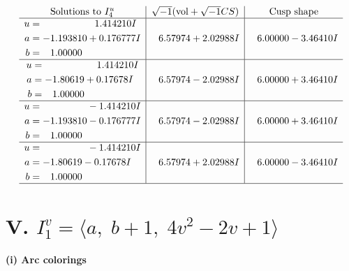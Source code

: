 \documentclass[1p]{elsarticle_modified}
\theoremstyle{definition}
\newcommand{\I}{\sqrt{-1}}
\begin{document}
$$\begin{array}{c|c|c}  
\text{Solutions to }I^u_{4}& \I (\text{vol} + \sqrt{-1}CS) & \text{Cusp shape}\\
 \hline 
\begin{aligned}
u &= \phantom{-0.000000 -}1.414210 I \\
a &= -1.193810 + 0.176777 I \\
b &= \phantom{-}1.00000\phantom{ +0.000000I}\end{aligned}
 & \phantom{-}6.57974 + 2.02988 I & \phantom{-}6.00000 - 3.46410 I \\ \hline\begin{aligned}
u &= \phantom{-0.000000 -}1.414210 I \\
a &= -1.80619 + 0.17678 I \\
b &= \phantom{-}1.00000\phantom{ +0.000000I}\end{aligned}
 & \phantom{-}6.57974 - 2.02988 I & \phantom{-}6.00000 + 3.46410 I \\ \hline\begin{aligned}
u &= \phantom{-0.000000 } -1.414210 I \\
a &= -1.193810 - 0.176777 I \\
b &= \phantom{-}1.00000\phantom{ +0.000000I}\end{aligned}
 & \phantom{-}6.57974 - 2.02988 I & \phantom{-}6.00000 + 3.46410 I \\ \hline\begin{aligned}
u &= \phantom{-0.000000 } -1.414210 I \\
a &= -1.80619 - 0.17678 I \\
b &= \phantom{-}1.00000\phantom{ +0.000000I}\end{aligned}
 & \phantom{-}6.57974 + 2.02988 I & \phantom{-}6.00000 - 3.46410 I\\
 \hline 
 \end{array}$$\newpage\newpage\renewcommand{\arraystretch}{1}
\centering \section*{V. $I^v_{1}= \langle a,\;b+1,\;4 v^2-2 v+1 \rangle$}
\flushleft \textbf{(i) Arc colorings}\\
\end{document}
